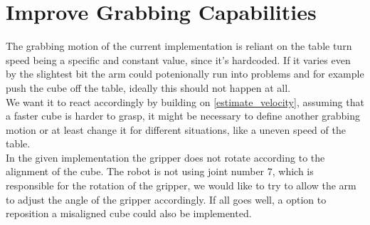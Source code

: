 \documentclass[report]{iisthesis}
\begin{document}
\section{Improve Grabbing Capabilities}
\label{improve_grabbing}
The grabbing motion of the current implementation is reliant on the table turn speed being a specific and constant value, since it's hardcoded. If it varies even by the slightest bit
the arm could potenionally run into problems and for example push the cube off the table, ideally this should not happen at all. \\
We want it to react accordingly by building on \ref{estimate_velocity}, assuming that a faster cube is harder to grasp, it might be necessary to define another grabbing motion 
or at least change it for different situations, like a uneven speed of the table. \\
In the given implementation the gripper does not rotate according to the alignment of the cube. The robot is not using joint number 7, which is responsible for the rotation of the gripper, we would like to try to allow the arm to adjust the angle of the gripper accordingly.
If all goes well, a option to reposition a misaligned cube could also be implemented.
\end{document}
